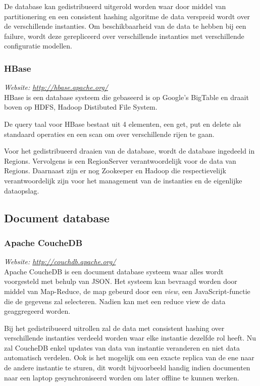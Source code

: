 De database kan gedistribueerd uitgerold worden waar door middel van partitionering en een consistent hashing algoritme de data verspreid wordt over de verschillende instanties. Om beschikbaarheid van de data te hebben bij een failure, wordt deze gerepliceerd over verschillende instanties met verschillende configuratie modellen. 

\subsubsection{HBase}
\textit{Website: \url{http://hbase.apache.org/}}\\
HBase is een database systeem die gebaseerd is op Google's BigTable en draait boven op HDFS, Hadoop Distibuted File System.

De query taal voor HBase bestaat uit 4 elementen, een get, put en delete als standaard operaties en een scan om over verschillende rijen te gaan. 

Voor het gedistribueerd draaien van de database, wordt de database ingedeeld in Regions. Vervolgens is een RegionServer verantwoordelijk voor de data van Regions. Daarnaast zijn er nog Zookeeper en Hadoop die respectievelijk verantwoordelijk zijn voor het management van de instanties en de eigenlijke dataopslag.

\subsection{Document database}
\subsubsection{Apache CoucheDB}
\textit{Website: \url{http://couchdb.apache.org/}}\\
Apache CoucheDB is een document database systeem waar alles wordt voorgesteld met behulp van JSON. Het systeem kan bevraagd worden door middel van Map-Reduce, de map gebeurd door een \textit{view}, een JavaScript-functie die de gegevens zal selecteren. Nadien kan met een reduce view de data geaggregeerd worden. 

Bij het gedistribueerd uitrollen zal de data met consistent hashing over verschillende instanties verdeeld worden waar elke instantie dezelfde rol heeft. Nu zal CoucheDB enkel updates van data van instantie veranderen en niet data automatisch verdelen. Ook is het mogelijk om een exacte replica van de ene naar de andere instantie te sturen, dit wordt bijvoorbeeld handig indien documenten naar een laptop gesynchroniseerd worden om later offline te kunnen werken.

